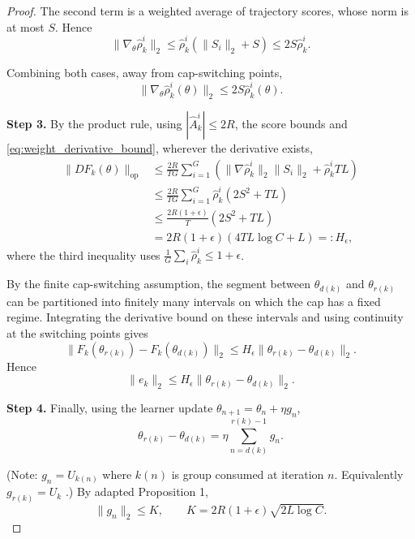 \begin{proof}
The second term is a weighted average of trajectory scores, whose norm is at most $S$. Hence
\begin{equation*}
\|\nabla_\theta\hat\rho_k^i\|_2
\le \hat\rho_k^i(\|S_i\|_2+S)
\le 2S\hat\rho_k^i.
\end{equation*}

Combining both cases, away from cap-switching points,
\begin{equation}
\|\nabla_\theta\hat\rho_k^i(\theta)\|_2
\le 2S\hat\rho_k^i(\theta).
\label{eq:weight_derivative_bound}
\end{equation}

\textbf{Step 3.} By the product rule, using
$|\widehat A_k^i|\le 2R$, the score bounds and
\eqref{eq:weight_derivative_bound}, wherever the derivative exists,
\begin{align*}
\|DF_k(\theta)\|_{\mathrm{op}}
&\le
\frac{2R}{TG}\sum_{i=1}^G
\left(
\|\nabla\hat\rho_k^i\|_2\|S_i\|_2
+\hat\rho_k^i TL
\right)\\
&\le
\frac{2R}{TG}\sum_{i=1}^G
\hat\rho_k^i(2S^2+TL)\\
&\le
\frac{2R(1+\epsilon)}{T}(2S^2+TL)\\
&=
2R(1+\epsilon)(4TL\log C+L)
=:H_\epsilon,
\end{align*}
where the third inequality uses
$\frac1G\sum_i\hat\rho_k^i\le 1+\epsilon$.

By the finite cap-switching assumption, the segment between
$\theta_{d(k)}$ and $\theta_{r(k)}$ can be partitioned into
finitely many intervals on which the cap has a fixed regime.
Integrating the derivative bound on these intervals and using
continuity at the switching points gives
\begin{equation*}
\|F_k(\theta_{r(k)})-F_k(\theta_{d(k)})\|_2
\le H_\epsilon
\|\theta_{r(k)}-\theta_{d(k)}\|_2.
\end{equation*}
Hence
\begin{equation*}
\|e_k\|_2
\le H_\epsilon
\|\theta_{r(k)}-\theta_{d(k)}\|_2.
\end{equation*}

\textbf{Step 4.} Finally, using the learner update
$\theta_{n+1}=\theta_n+\eta g_n$,
\begin{equation*}
\theta_{r(k)}-\theta_{d(k)}
=
\eta\sum_{n=d(k)}^{r(k)-1}g_n.
\end{equation*}

(Note: $g_n=U_{k(n)}$ where $k(n)$ is group consumed at iteration $n$. Equivalently $g_{r(k)}=U_k$ .)
By adapted Proposition 1,
\begin{equation*}
\|g_n\|_2\le K,
\qquad
K=2R(1+\epsilon)\sqrt{2L\log C}.
\end{equation*}


\end{proof}
